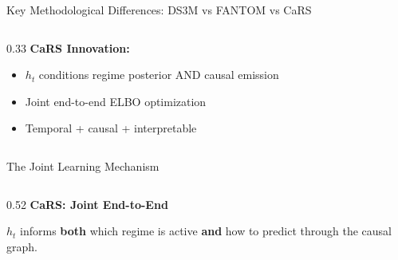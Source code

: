 \documentclass[aspectratio=169]{beamer}
\begin{document}
\begin{frame}{Key Methodological Differences: DS3M vs FANTOM vs CaRS}
\begin{columns}
\begin{column}{0.33\textwidth}
\textcolor{reprogreen}{\textbf{CaRS Innovation:}}
\begin{itemize}
    \item $h_t$ conditions regime posterior AND causal emission
    \item Joint end-to-end ELBO optimization
    \item Temporal + causal + interpretable
\end{itemize}
\end{column}
\end{columns}
\end{frame}

\begin{frame}{The Joint Learning Mechanism}
\small
\begin{columns}
\begin{column}{0.52\textwidth}
\textcolor{reprogreen}{\textbf{CaRS: Joint End-to-End}}\\[4pt]
\begin{center}
\end{center}
\vspace{2pt}
{\scriptsize $h_t$ informs \textbf{both} which regime is active \textbf{and} how to predict through the causal graph.}
\end{column}


\end{columns}
\end{frame}
\end{document}

